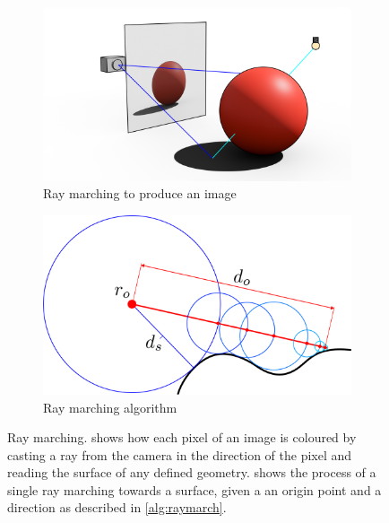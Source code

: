 \documentclass{l4proj}
\begin{document}
\begin{figure}[H]
  \centering
  \begin{subfigure}[b]{0.45\textwidth}
      \includegraphics[width=\textwidth]{images/raymarching/raymarch_ai.png}
      \caption{Ray marching to produce an image}
      \label{fig:rmcast}
  \end{subfigure}
  \begin{subfigure}[b]{0.45\textwidth}
      \includegraphics[width=\textwidth]{images/raymarching/algorithm_ai.png}
      \caption{Ray marching algorithm}
      \label{fig:rmalg}
  \end{subfigure}   
  \caption{Ray marching.  shows how each pixel of an image is coloured by casting a ray from the camera in the direction of the pixel and reading the surface of any defined geometry. 
   shows the process of a single ray marching towards a surface, given a an origin point and a direction as described in \cref{alg:raymarch}.
  }\label{fig:raymarch}
\end{figure}
%
\end{document}

